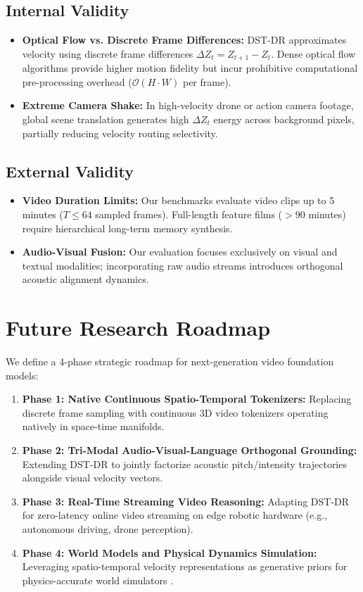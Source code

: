 \documentclass{article}
\begin{document}
\subsection{Internal Validity}

\begin{itemize}
  \item \textbf{Optical Flow vs. Discrete Frame Differences:} DST-DR approximates velocity using discrete frame differences $\Delta Z_t = Z_{t+1} - Z_t$. Dense optical flow algorithms provide higher motion fidelity but incur prohibitive computational pre-processing overhead ($\mathcal{O}(H \cdot W)$ per frame).
  \item \textbf{Extreme Camera Shake:} In high-velocity drone or action camera footage, global scene translation generates high $\Delta Z_t$ energy across background pixels, partially reducing velocity routing selectivity.
\end{itemize}


\subsection{External Validity}

\begin{itemize}
  \item \textbf{Video Duration Limits:} Our benchmarks evaluate video clips up to 5 minutes ($T \le 64$ sampled frames). Full-length feature films ($>90$ minutes) require hierarchical long-term memory synthesis.
  \item \textbf{Audio-Visual Fusion:} Our evaluation focuses exclusively on visual and textual modalities; incorporating raw audio streams introduces orthogonal acoustic alignment dynamics.
\end{itemize}




\section{Future Research Roadmap}


We define a 4-phase strategic roadmap for next-generation video foundation models:
\begin{enumerate}
  \item \textbf{Phase 1: Native Continuous Spatio-Temporal Tokenizers:} Replacing discrete frame sampling with continuous 3D video tokenizers operating natively in space-time manifolds.
  \item \textbf{Phase 2: Tri-Modal Audio-Visual-Language Orthogonal Grounding:} Extending DST-DR to jointly factorize acoustic pitch/intensity trajectories alongside visual velocity vectors.
  \item \textbf{Phase 3: Real-Time Streaming Video Reasoning:} Adapting DST-DR for zero-latency online video streaming on edge robotic hardware (e.g., autonomous driving, drone perception).
  \item \textbf{Phase 4: World Models and Physical Dynamics Simulation:} Leveraging spatio-temporal velocity representations as generative priors for physics-accurate world simulators \cite{arxiv_2501_02497}.
\end{enumerate}
\end{document}
